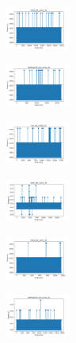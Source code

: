 \begin{figure}[H]
\begin{subfigure}
        \centering
        \includegraphics[width=0.234\textwidth]{img/hs/rand_set_const_10_277451237_time.png}
    \end{subfigure}
    \hfill
    \begin{subfigure}
        \centering
        \includegraphics[width=0.234\textwidth]{img/hs/newthyroid_set_const_10_277451237_time.png}
    \end{subfigure}
    \hfill
    \begin{subfigure}
        \centering
        \includegraphics[width=0.234\textwidth]{img/hs/iris_set_const_10_49258669_time.png}
    \end{subfigure}
    \hfill
    \begin{subfigure}
        \centering
        \includegraphics[width=0.234\textwidth]{img/hs/ecoli_set_const_10_49258669_time.png}
    \end{subfigure}
    \hfill
    \begin{subfigure}
        \centering
        \includegraphics[width=0.234\textwidth]{img/hs/rand_set_const_10_49258669_time.png}
    \end{subfigure}
    \hfill
    \begin{subfigure}
        \centering
        \includegraphics[width=0.234\textwidth]{img/hs/newthyroid_set_const_10_49258669_time.png}

\end{subfigure}
\end{figure}
